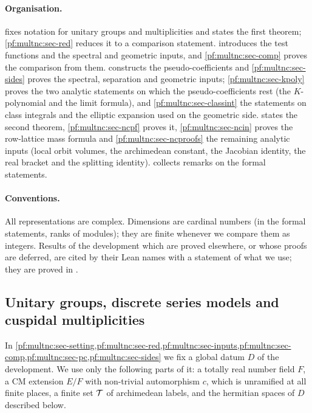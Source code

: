 \paragraph{Organisation.}  fixes notation for unitary groups and multiplicities and states
the first theorem; \cref{pf:multnc:sec-red} reduces it to a comparison statement.  introduces
the test functions and the spectral and geometric inputs, and \cref{pf:multnc:sec-comp} proves the comparison from them.
 constructs the pseudo-coefficients and \cref{pf:multnc:sec-sides} proves the spectral,
separation and geometric inputs; \cref{pf:multnc:sec-kpoly} proves the two analytic statements on which the
pseudo-coefficients rest (the $K$-polynomial and the limit formula), and \cref{pf:multnc:sec-classint} the statements on
class integrals and the elliptic expansion used on the geometric side.  states the second theorem,
\cref{pf:multnc:sec-ncpf} proves it, \cref{pf:multnc:sec-ncin} proves the row-lattice mass formula and
\cref{pf:multnc:sec-ncproofs} the remaining analytic inputs (local orbit volumes, the archimedean constant, the Jacobian
identity, the real bracket and the splitting identity).  collects remarks on the formal
statements.

\paragraph{Conventions.} All representations are complex. Dimensions are cardinal numbers (in the formal statements,
ranks of modules); they are finite whenever we compare them as integers. Results of the development which are proved
elsewhere, or whose proofs are deferred, are cited by their Lean names with a statement of what we use; they are proved
in \cite{LeanSource2026}.

\subsection{Unitary groups, discrete series models and cuspidal multiplicities}\label{pf:multnc:sec-setting}

In \cref{pf:multnc:sec-setting,pf:multnc:sec-red,pf:multnc:sec-inputs,pf:multnc:sec-comp,pf:multnc:sec-pc,pf:multnc:sec-sides}
we fix a global datum $D$ of the development. We use only the following parts of it: a totally real number field $F$, a
CM extension $E/F$ with non-trivial automorphism $c$, which is unramified at all finite places, a finite set $\mathcal{T}$
of archimedean labels, and the hermitian spaces of $D$ described below.

